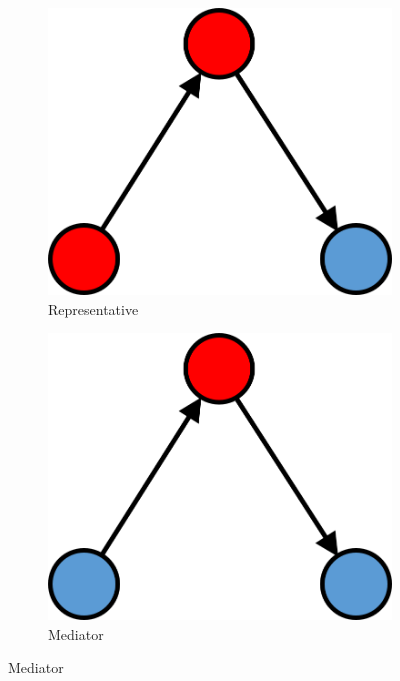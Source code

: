 \begin{figure}
  \hspace{2em}
  \begin{subfigure}[b]{0.25\textwidth}
    \includegraphics[width=\textwidth]{Images/b_IO.png}
    \caption{Representative}
    \label{fig:3}
  \end{subfigure}
  \par \bigskip
  \begin{subfigure}[b]{0.25\textwidth}
    \includegraphics[width=\textwidth]{Images/w_O.png}
    \caption{Mediator}
    \label{fig:4}
  \end{subfigure}

\end{figure}
